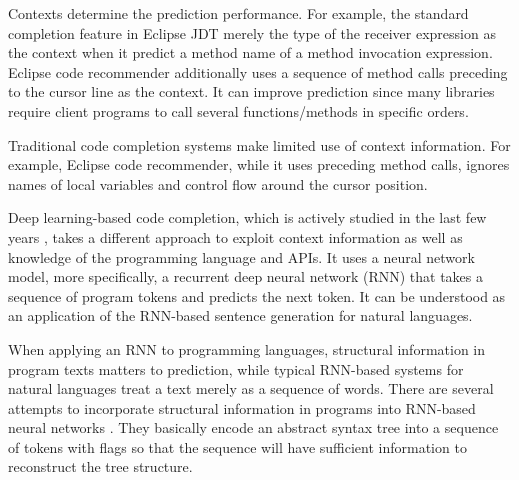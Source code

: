 \documentclass[E]{compsoft}
\begin{document}
Contexts determine the prediction performance.  For example, the standard completion feature in Eclipse JDT merely the type of the receiver expression as the context when it predict a method name of a method invocation expression.  Eclipse code recommender \cite{heinemann2011suite} additionally uses a sequence of method calls preceding to the cursor line as the context.  It can improve prediction 
since many libraries require client programs to call several functions/methods in specific orders.

Traditional code completion systems make limited use of context information.  For example, Eclipse code recommender, while it uses preceding method calls, ignores names of local variables and control flow around the cursor position.  %


Deep learning-based code completion, which is actively studied in the last few years \cite{liu2016neural,dataset,raychev2014code,white2015toward}, takes a different approach to exploit context information as well as knowledge of the programming language and APIs.  
It uses a neural network model, more specifically, a recurrent deep neural network (RNN) that takes a sequence of program tokens and predicts the next token.  It can be understood as an application of the RNN-based sentence generation for natural languages.%

When applying an RNN to programming languages, structural information in program texts matters to prediction, while typical RNN-based systems for natural languages  treat a text merely as a sequence of words.  There are several attempts to incorporate structural information in programs into RNN-based neural networks \cite{bielik2016phog,liu2016neural,raychev2016probabilistic}.  They basically encode an abstract syntax tree into a sequence of tokens with flags so that the sequence will have sufficient information to reconstruct the tree structure.
\end{document}
